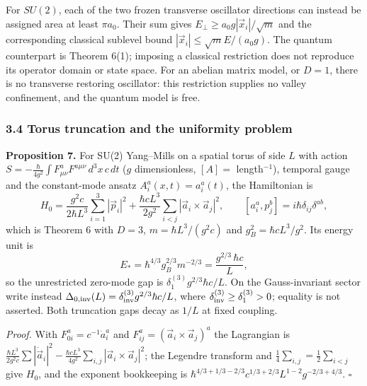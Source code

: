 \documentclass[11pt,a4paper]{article}
\begin{document}
For \(SU(2)\), each of the two frozen transverse oscillator directions
can instead be assigned area at least \(\pi a_0\). Their sum gives
\(E_\perp\ge a_0g|\vec x_i|/\sqrt m\) and the corresponding classical
sublevel bound \(|\vec x_i|\le\sqrt m E/(a_0g)\). The quantum
counterpart is Theorem 6(1); imposing a classical restriction does not
reproduce its operator domain or state space. For an abelian matrix
model, or \(D=1\), there is no transverse restoring oscillator: this
restriction supplies no valley confinement, and the quantum model is
free.

\hypertarget{torus-truncation-and-the-uniformity-problem}{%
\subsubsection{3.4 Torus truncation and the uniformity
problem}\label{torus-truncation-and-the-uniformity-problem}}

\textbf{Proposition 7.} For SU(2) Yang--Mills on a spatial torus of side
\(L\) with action
\(S=-\frac{\hbar}{4g^2}\int F^a_{\mu\nu}F^{a\mu\nu}\,d^3x\,c\,dt\)
(\(g\) dimensionless, \([A]=\) length\(^{-1}\)), temporal gauge and the
constant-mode ansatz \(A^a_i(x,t)=a^a_i(t)\), the Hamiltonian is
\[H_0=\frac{g^2c}{2\hbar L^3}\sum_{i=1}^3|\vec p_i|^2
+\frac{\hbar cL^3}{2g^2}\sum_{i<j}|\vec a_i\times\vec a_j|^2,\qquad
[a^a_i,p^b_j]=i\hbar\delta_{ij}\delta^{ab},\] which is Theorem 6 with
\(D=3\), \(m=\hbar L^3/(g^2c)\) and \(g_B^2=\hbar cL^3/g^2\). Its energy
unit is
\[{E_*}=\hbar^{4/3}g_B^{2/3}m^{-2/3}=\frac{g^{2/3}\,\hbar c}{L},\] so
the unrestricted zero-mode gap is \(\delta_1^{(3)}g^{2/3}\hbar c/L\). On
the Gauss-invariant sector write instead
\(\Delta_{0,\rm inv}(L)=\delta_{\rm inv}^{(3)}g^{2/3}\hbar c/L\), where
\(\delta_{\rm inv}^{(3)}\ge\delta_1^{(3)}>0\); equality is not asserted.
Both truncation gaps decay as \(1/L\) at fixed coupling.

\emph{Proof.} With \(F^a_{0i}=c^{-1}\dot a^a_i\) and
\(F^a_{ij}=(\vec a_i\times\vec a_j)^a\) the Lagrangian is
\(\frac{\hbar L^3}{2g^2c}\sum|\dot{\vec a}_i|^2 -\frac{\hbar cL^3}{4g^2}\sum_{i,j}|\vec a_i\times\vec a_j|^2\);
the Legendre transform and \(\tfrac14\sum_{i,j}=\tfrac12\sum_{i<j}\)
give \(H_0\), and the exponent bookkeeping is
\(\hbar^{4/3+1/3-2/3}c^{1/3+2/3}L^{1-2}g^{-2/3+4/3}\). \(\square\)
\end{document}
